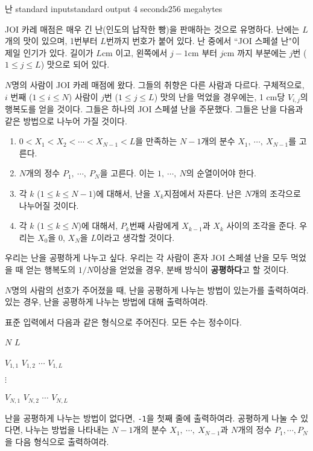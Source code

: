 \begin{problem}{난}
	{standard input}{standard output}
	{4 seconds}{256 megabytes}{}
	
	JOI 카레 매점은 매우 긴 난(인도의 납작한 빵)을 판매하는 것으로 유명하다. 난에는 $L$개의 맛이 있으며, 1번부터 $L$번까지 번호가 붙어 있다. 난 중에서 ``JOI 스페셜 난"이 제일 인기가 있다. 길이가 $L$cm 이고, 왼쪽에서 $j-1$cm 부터 $j$cm 까지 부분에는 $j$번 ($1\le j \le L$) 맛으로 되어 있다.
	
	$N$명의 사람이 JOI 카레 매점에 왔다. 그들의 취향은 다른 사람과 다르다. 구체적으로, $i$ 번째 ($1 \le i \le N$) 사람이 $j$번 ($1 \le j \le L$) 맛의 난을 먹었을 경우에는, 1 cm당 $V_{i, j}$의 행복도를 얻을 것이다.
	그들은 하나의 JOI 스페셜 난을 주문했다. 그들은 난을 다음과 같은 방법으로 나누어 가질 것이다.
	
	\begin{enumerate}
		\item $0 < X_1 < X_2 < \cdots < X_{N-1} < L$을 만족하는 $N-1$개의 분수 $X_1,\ \cdots,\ X_{N-1}$를 고른다.
		\item $N$개의 정수 $P_1,\ \cdots, \ P_N$을 고른다. 이는 $1, \ \cdots, \ N$의 순열이어야 한다.
		\item 각 $k$ ($1 \le k \le N-1$)에 대해서, 난을 $X_k$지점에서 자른다. 난은 $N$개의 조각으로 나누어질 것이다.
		\item 각 $k$ ($1 \le k \le N$)에 대해서, $P_k$번째 사람에게 $X_{k-1}$과 $X_k$ 사이의 조각을 준다. 우리는 $X_0$을 0, $X_N$을 $L$이라고 생각할 것이다.
	\end{enumerate}

	우리는 난을 공평하게 나누고 싶다. 우리는 각 사람이 혼자 JOI 스페셜 난을 모두 먹었을 때 얻는 행복도의 $1/N$이상을 얻었을 경우, 분배 방식이 \textbf{공평하다}고 할 것이다.
	
	$N$명의 사람의 선호가 주어졌을 때, 난을 공평하게 나누는 방법이 있는가를 출력하여라. 있는 경우, 난을 공평하게 나누는 방법에 대해 출력하여라.
	
	\InputFile
	
	표준 입력에서 다음과 같은 형식으로 주어진다. 모든 수는 정수이다.
	
	$N$ $L$
	
	$V_{1,1}$ $V_{1, 2}$ $\cdots$ $V_{1, L}$
	
	$\vdots$
	
	$V_{N,1}$ $V_{N, 2}$ $\cdots$ $V_{N, L}$
	
	\OutputFile
	
	난을 공평하게 나누는 방법이 없다면, \texttt{-1}을 첫째 줄에 출력하여라. 공평하게 나눌 수 있다면, 나누는 방법을 나타내는 $N-1$개의 분수 $X_1,\ \cdots,\ X_{N-1}$과 $N$개의 정수 $P_1, \cdots, P_N$을 다음 형식으로 출력하여라.
	

\end{problem}

